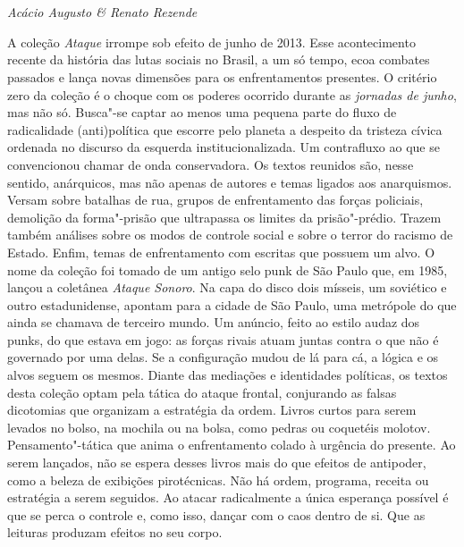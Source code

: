 \chapter*{}

\begin{flushright}
\emph{Acácio Augusto \& Renato Rezende}
\end{flushright}

\medskip

\noindent{}A coleção \emph{Ataque} irrompe sob efeito de junho de 2013.
Esse acontecimento recente da história das lutas sociais no Brasil, a um só
tempo, ecoa combates passados e lança novas dimensões para os
enfrentamentos presentes. O critério zero da coleção é o choque com os
poderes ocorrido durante as \emph{jornadas de
junho}, mas não só. Busca"-se captar ao menos uma pequena parte do fluxo de
radicalidade (anti)política que escorre pelo planeta a despeito da
tristeza cívica ordenada no discurso da esquerda institucionalizada. Um
contrafluxo ao que se convencionou chamar de onda conservadora. Os
textos reunidos são, nesse sentido,
anárquicos, mas não apenas de autores e temas ligados aos
anarquismos. Versam sobre batalhas de
rua, grupos de enfrentamento das forças policiais, demolição da forma"-prisão que
ultrapassa os limites da prisão"-prédio. Trazem também análises sobre os
modos de controle social e sobre o terror do racismo de Estado. Enfim, temas de enfrentamento com
escritas que possuem um alvo. 
O nome da coleção foi tomado de um antigo
selo punk de São Paulo que, em 1985, lançou a coletânea \emph{Ataque
Sonoro}. Na capa do disco dois mísseis, um soviético e outro
estadunidense, apontam para a cidade de São Paulo, uma metrópole do que
ainda se chamava de terceiro mundo. Um anúncio, feito ao estilo audaz
dos punks, do que estava em jogo: as forças rivais atuam juntas contra o
que não é governado por uma delas. Se a configuração mudou de lá para
cá, a lógica e os alvos seguem os mesmos. Diante das mediações e
identidades políticas, os textos desta coleção optam pela tática do
ataque frontal, conjurando as falsas dicotomias que organizam a
estratégia da ordem. Livros curtos para serem levados no bolso, na
mochila ou na bolsa, como pedras ou coquetéis molotov.
Pensamento"-tática que anima o enfrentamento colado à urgência do
presente. Ao serem lançados, não se espera desses livros mais do que
efeitos de antipoder, como a beleza de exibições pirotécnicas. Não há
ordem, programa, receita ou estratégia a serem seguidos. Ao atacar
radicalmente a única esperança possível é que se perca o controle e,
como isso, dançar com o caos dentro de si. Que as leituras produzam
efeitos no seu corpo.

